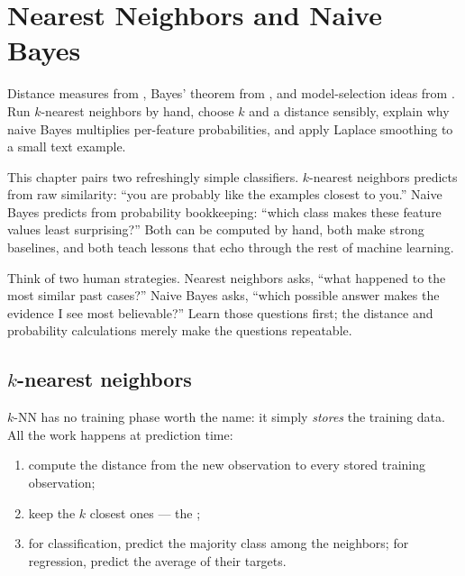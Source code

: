\chapter{Nearest Neighbors and Naive Bayes}
\label{ch:knn-nb}

\chapterguide%
  {Distance measures from , Bayes' theorem from , and model-selection ideas from .}
  {Run $k$-nearest neighbors by hand, choose $k$ and a distance sensibly, explain why naive Bayes multiplies per-feature probabilities, and apply Laplace smoothing to a small text example.}

This chapter pairs two refreshingly simple classifiers. $k$-nearest neighbors predicts from raw similarity: ``you are probably like the examples closest to you.'' Naive Bayes predicts from probability bookkeeping: ``which class makes these feature values least surprising?'' Both can be computed by hand, both make strong baselines, and both teach lessons that echo through the rest of machine learning.

\begin{firstread}
Think of two human strategies. Nearest neighbors asks, ``what happened to the most similar past cases?'' Naive Bayes asks, ``which possible answer makes the evidence I see most believable?'' Learn those questions first; the distance and probability calculations merely make the questions repeatable.
\end{firstread}

\section{$k$-nearest neighbors}
\label{sec:knn}

$k$-NN has no training phase worth the name: it simply \emph{stores} the training data. All the work happens at prediction time:

\begin{enumerate}
  \item compute the distance from the new observation to every stored training observation;
  \item keep the $k$ closest ones --- the ;
  \item for classification, predict the majority class among the neighbors; for regression, predict the average of their targets.
\end{enumerate}

